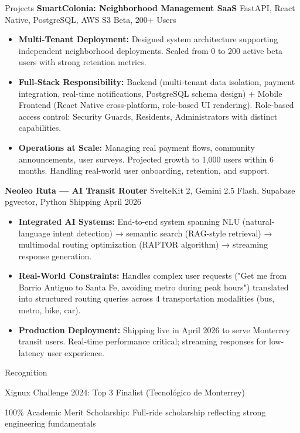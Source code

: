 \documentclass{resume}
\begin{document}
\begin{rSection}{Projects}
\textbf{SmartColonia: Neighborhood Management SaaS} {FastAPI, React Native, PostgreSQL, AWS S3} \hfill {Beta, 200+ Users}
\begin{itemize}
    \item \textbf{Multi-Tenant Deployment:} Designed system architecture supporting independent neighborhood deployments. Scaled from 0 to 200 active beta users with strong retention metrics.
    \item \textbf{Full-Stack Responsibility:} Backend (multi-tenant data isolation, payment integration, real-time notifications, PostgreSQL schema design) + Mobile Frontend (React Native cross-platform, role-based UI rendering). Role-based access control: Security Guards, Residents, Administrators with distinct capabilities.
    \item \textbf{Operations at Scale:} Managing real payment flows, community announcements, user surveys. Projected growth to 1,000 users within 6 months. Handling real-world user onboarding, retention, and support.
\end{itemize}

\textbf{Neoleo Ruta — AI Transit Router} {SvelteKit 2, Gemini 2.5 Flash, Supabase pgvector, Python} \hfill {Shipping April 2026}
\begin{itemize}
    \item \textbf{Integrated AI Systems:} End-to-end system spanning NLU (natural-language intent detection) → semantic search (RAG-style retrieval) → multimodal routing optimization (RAPTOR algorithm) → streaming response generation.
    \item \textbf{Real-World Constraints:} Handles complex user requests ("Get me from Barrio Antiguo to Santa Fe, avoiding metro during peak hours") translated into structured routing queries across 4 transportation modalities (bus, metro, bike, car).
    \item \textbf{Production Deployment:} Shipping live in April 2026 to serve Monterrey transit users. Real-time performance critical; streaming responses for low-latency user experience.
\end{itemize}

\end{rSection}

\begin{rSection}{Recognition}
\item Xignux Challenge 2024: Top 3 Finalist (Tecnológico de Monterrey)
\item 100\% Academic Merit Scholarship: Full-ride scholarship reflecting strong engineering fundamentals
\end{rSection}
\end{document}
